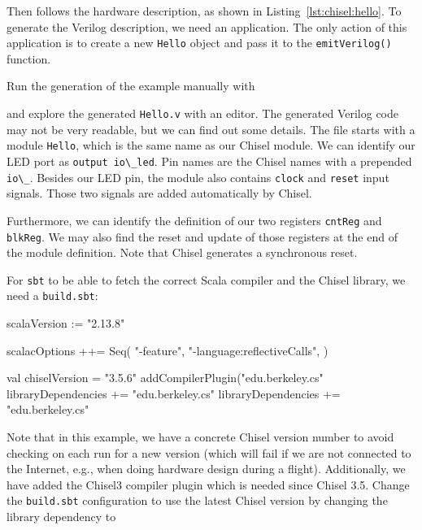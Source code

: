 \documentclass[%
    10pt,
    headinclude, footexclude,
    openright, %
    notitlepage,
    cleardoubleempty,
    headsepline,
    pointlessnumbers,
    bibtotoc, idxtotoc,
    ]{scrbook}
\newcommand{\code}[1]{{\lstinline[basicstyle=\small\ttfamily]{#1}}}
\begin{document}

\noindent Then follows the hardware description, as shown in Listing~\ref{lst:chisel:hello}.
To generate the Verilog description, we need an application.
The only action of this application is to create a new \code{Hello} object and pass it
to the \code{emitVerilog()} function.


\noindent Run the generation of the example manually with


and explore the generated \code{Hello.v} with an editor. The generated Verilog code may not be
very readable, but we can find out some details. The file starts with a module \code{Hello},
which is the same name as our Chisel module. We can identify our LED port as
\code{output io\_led}. Pin names are the Chisel names with a prepended \code{io\_}.
Besides our LED pin, the module also contains \code{clock} and \code{reset} input signals.
Those two signals are added automatically by Chisel.

Furthermore, we can identify the definition of our two registers \code{cntReg} and \code{blkReg}.
We may also find the reset and update of those registers at the end of the module definition.
Note that Chisel generates a synchronous reset.

For \code{sbt} to be able to fetch the correct Scala compiler and the Chisel library,
we need a \code{build.sbt}:

\begin{chisel}
scalaVersion := "2.13.8"

scalacOptions ++= Seq(
  "-feature",
  "-language:reflectiveCalls",
)

val chiselVersion = "3.5.6"
addCompilerPlugin("edu.berkeley.cs" %
libraryDependencies += "edu.berkeley.cs" %
libraryDependencies += "edu.berkeley.cs" %

\end{chisel}

\noindent Note that in this example, we have a concrete Chisel version number to avoid checking on
each run for a new version (which will fail if we are not connected to the Internet,
e.g., when doing hardware design during a flight). Additionally, we have added the Chisel3 compiler
plugin which is needed since Chisel 3.5.
Change the \code{build.sbt} configuration to use the latest Chisel version by changing the
library dependency to
\end{document}
